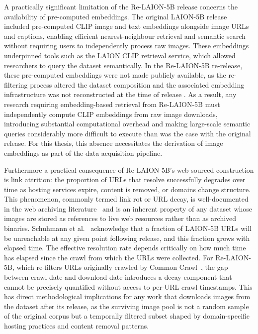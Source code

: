 A practically significant limitation of the Re-LAION-5B release concerns the availability of pre-computed embeddings. The original LAION-5B release included pre-computed CLIP image and text embeddings alongside image URLs and captions, enabling efficient nearest-neighbour retrieval and semantic search without requiring users to independently process raw images. These embeddings underpinned tools such as the LAION CLIP retrieval service, which allowed researchers to query the dataset semantically. In the Re-LAION-5B re-release, these pre-computed embeddings were not made publicly available, as the re-filtering process altered the dataset composition and the associated embedding infrastructure was not reconstructed at the time of release \cite{Laion_2024_Relaion5B}. As a result, any research requiring embedding-based retrieval from Re-LAION-5B must independently compute CLIP embeddings from raw image downloads, introducing substantial computational overhead and making large-scale semantic queries considerably more difficult to execute than was the case with the original release. For this thesis, this absence necessitates the derivation of image embeddings as part of the data acquisition pipeline.

Furthermore a practical consequence of Re-LAION-5B's web-sourced construction
is link attrition: the proportion of URLs that resolve successfully
degrades over time as hosting services expire, content is removed, or
domains change structure. This phenomenon, commonly termed link rot or
URL decay, is well-documented in the web archiving
literature~\cite{Klein_2014_LinkRot} and is an inherent property of
any dataset whose images are stored as references to live web resources
rather than as archived binaries. Schuhmann et al.~\cite{Schuhmann_2022_Laion5b}
acknowledge that a fraction of LAION-5B URLs will be unreachable at any
given point following release, and this fraction grows with elapsed time.
The effective resolution rate depends critically on how much time has
elapsed since the crawl from which the URLs were collected. For
Re-LAION-5B, which re-filters URLs originally crawled by Common
Crawl~\cite{CommonCrawl_2007_CommonCrawl}, the gap between crawl date and download
date introduces a decay component that cannot be precisely quantified
without access to per-URL crawl timestamps. This has direct
methodological implications for any work that downloads images from the
dataset after its release, as the surviving image pool is not a random
sample of the original corpus but a temporally filtered subset shaped by
domain-specific hosting practices and content removal patterns.

